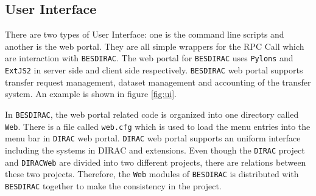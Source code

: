 \subsection{User Interface}
There are two types of User Interface: one is the command line scripts and 
another is the web portal. 
They are all simple wrappers for the RPC Call which are interaction
with {\tt BESDIRAC}.
The web portal for {\tt BESDIRAC} uses {\tt Pylons} and {\tt ExtJS2} 
in server side and
client side respectively\cite{bib:webportal}. {\tt BESDIRAC} web portal supports
transfer request management, dataset management and  
accounting of the transfer system. An example is shown in figure
\ref{fig:ui}.

In {\tt BESDIRAC}, the web portal related code is organized into one
directory called {\tt Web}. There is a file called \verb"web.cfg"
which is used to load the menu entries into the menu bar in {\tt DIRAC} 
web portal. {\tt DIRAC} web portal supports an uniform interface including
the systems in DIRAC and extensions.
Even though the {\tt DIRAC} project and {\tt DIRACWeb} are divided into
two different projects, there are relations between these two projects. 
Therefore, the {\tt Web} modules of {\tt BESDIRAC} is distributed 
with {\tt BESDIRAC} together to make the consistency in the project. 


